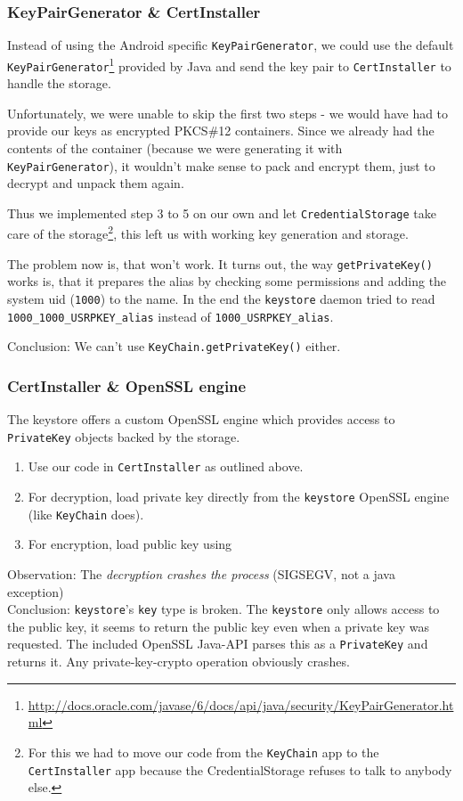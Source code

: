 \documentclass[a4paper,draft]{scrartcl}
\begin{document}
		\subsubsection{KeyPairGenerator \& CertInstaller}			
			Instead of using the Android specific \texttt{KeyPairGenerator}, we could use the default \texttt{KeyPairGenerator}\footnote{\url{http://docs.oracle.com/javase/6/docs/api/java/security/KeyPairGenerator.html}} provided by Java and send the key pair to \texttt{CertInstaller} to handle the storage.
			
			Unfortunately, we were unable to skip the first two steps - we would have had to provide our keys as encrypted PKCS\#12 containers. Since we already had the contents of the container (because we were generating it with \texttt{KeyPairGenerator}), it wouldn't make sense to pack and encrypt them, just to decrypt and unpack them again.
			
			Thus we implemented step 3 to 5 on our own and let \texttt{CredentialStorage} take care of the storage\footnote{For this we had to move our code from the \texttt{KeyChain} app to the \texttt{CertInstaller} app because the CredentialStorage refuses to talk to anybody else.}, this left us with working key generation and storage.
			
			The problem now is, that  won't work. It turns out, the way \texttt{getPrivateKey()} works is, that it prepares the alias by checking some permissions and adding the system uid (\texttt{1000}) to the name. In the end the \texttt{keystore} daemon tried to read \texttt{1000\_1000\_USRPKEY\_alias} instead of \texttt{1000\_USRPKEY\_alias}.

			Conclusion: We can't use \texttt{KeyChain.getPrivateKey()} either.

		\subsubsection{CertInstaller \& OpenSSL engine}
			The keystore offers a custom OpenSSL engine which provides access to \texttt{PrivateKey} objects backed by the storage.

			\begin{enumerate}
				\item Use our code in \texttt{CertInstaller} as outlined above.
				\item For decryption, load private key directly from the \texttt{keystore} OpenSSL engine (like \texttt{KeyChain} does).
				\item For encryption, load public key using 
			\end{enumerate}
			Observation:
			The \emph{decryption crashes the process} (SIGSEGV, not a java exception)\\
			Conclusion:
			\texttt{keystore}'s \texttt{key} type is broken. The \texttt{keystore} only allows access to the public key, it seems to return the public key even when a private key was requested. The included OpenSSL Java-API parses this as a \texttt{PrivateKey} and returns it. Any private-key-crypto operation obviously crashes.
		
\end{document}
